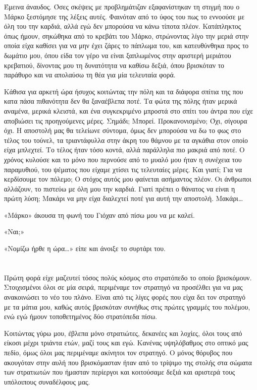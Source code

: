 \documentclass[12pt,twoside, openany]{book}
\begin{document}
Έμεινα άναυδος. Όσες σκέψεις με προβλημάτιζαν εξαφανίστηκαν τη στιγμή που ο Μάρκο ξεστόμησε της λέξεις αυτές. Φαινόταν από το ύφος του πως το εννοούσε με όλη του την καρδιά, αλλά εγώ δεν μπορούσα να κάνω τίποτα πλέον. Κατάπληκτος όπως ήμουν, σηκώθηκα από το κρεβάτι του Μάρκο, στρώνοντας λίγο την μεριά στην οποία είχα καθίσει για να μην έχει ζάρες το πάπλωμα του, και κατευθύνθηκα προς το δωμάτιο μου, όπου είδα τον γέρο να είναι ξαπλωμένος στην αριστερή μεριάτου κρεβατιού, δίνοντας μου τη δυνατότητα να καθίσω δεξιά, όπου βρισκόταν το παράθυρο και να απολαύσω τη θέα για μία τελευταία φορά.

Κάθισα για αρκετή ώρα ήσυχος κοιτώντας την πόλη και τα διάφορα σπίτια της που κατα πάσα πιθανότητα δεν θα ξαναέβλεπα ποτέ. Τα φώτα της πόλης ήταν μερικά αναμένα, μερικά κλειστά, και ένα συγκεκριμένο μπροστά στο σπίτι του άντρα που είχε αποβιώσει τις προηγούμενες μέρες. Σημάδι; Μπορεί. Προκανονισμένο; Όχι, σίγουρα όχι. Η αποστολή μας θα τελείωνε σύντομα, όμως δεν μπορούσα να δω το φως στο τέλος του τούνελ, τα τριαντάφυλλα στην άκρη του θάμνου με τα αγκάθια στον οποίο είχα μπλεχτεί. Το τέλος ήταν τόσο κοντά, αλλά παράλληλα πιο μακριά από ποτέ. Ο χρόνος κυλούσε και το μόνο που περνούσε από το μυαλό μου ήταν η συνέχεια του παραμυθιού, του ψέματος που είχαμε χτίσει τις τελευταίες μέρες. Και γιατί; Για να κερδίσουμε τον πόλεμο; Ο στόχος αυτός μου φαίνεται ασήμαντος πλέον. Οι άνθρωποι αλλάζουν, το πιστεύω με όλη μου την καρδιά. Γιατί πρέπει ο θάνατος να είναι η πρώτη λύση; Μακάρι να μην είχα διαλεχτεί ποτέ για αυτή την αποστολή. Μακάρι…

«Μάρκο» άκουσα τη φωνή του Γιόχαν από πίσω μου να με καλεί.

«Ναι;» 

«Νομίζω ήρθε η ώρα…» είπε και άνοιξε το συρτάρι του.


\chapter{}

Πρώτη φορά είχε μαζευτεί τόσος πολύς κόσμος στο στρατόπεδο το οποίο βρισκόμουν. Στοιχισμένοι όλοι σε μία σειρά, περιμέναμε τον στρατηγό να προσέλθει για να μας ανακοινώσει το νέο του πλάνο. Είναι από τις λίγες φορές που είχα δει τον στρατηγό με τα μάτια μου, καθώς αυτός βρισκόταν συνήθως στις πρώτες γραμμές του πολέμου, ενώ εγώ ήμουν τοποθετημένος δύο στρατόπεδα πίσω. 

Κοιτώντας γύρω μου, έβλεπα μόνο στρατιώτες, δεκανέες και λοχίες, όλοι τους από είκοσι μέχρι τριάντα ετών, μαζί τους και εγώ. Κανένας υψηλόβαθμος στο οπτικό μας πεδίο, όμως όλοι μας περιμέναμε ακίνητοι τον στρατηγό. Ο μόνος θόρυβος που ακουγόταν στην αυλή που βρισκόμασταν ήταν από το τρίψιμο της στολής στα σώματα των στρατιωτών που ήμασταν περίεργοι και κοιτούσαμε δεξιά και αριστερά τους υπόλοιπους συναδέλφους μας.
\end{document}
